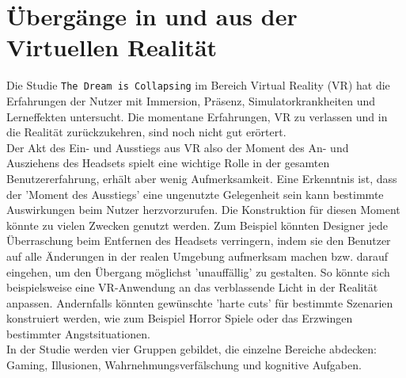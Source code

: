 \section{Übergänge in und aus der Virtuellen Realität}\label{sec:relatedWork.vr}

Die Studie \texttt{The Dream is Collapsing} im Bereich Virtual Reality (VR) hat die Erfahrungen der Nutzer mit Immersion, Präsenz, Simulatorkrankheiten und Lerneffekten untersucht. Die momentane Erfahrungen, VR zu verlassen und in die Realität zurückzukehren, sind noch nicht gut erörtert.\\
Der Akt des Ein- und Ausstiegs aus VR also der Moment des An- und Ausziehens des Headsets spielt eine wichtige Rolle in der gesamten Benutzererfahrung, erhält aber wenig Aufmerksamkeit. Eine Erkenntnis ist, dass der 'Moment des Ausstiegs' eine ungenutzte Gelegenheit sein kann bestimmte Auswirkungen beim Nutzer herzvorzurufen. Die Konstruktion für diesen Moment könnte zu vielen Zwecken genutzt werden. Zum Beispiel könnten Designer jede Überraschung beim Entfernen des Headsets verringern, indem sie den Benutzer auf alle Änderungen in der realen Umgebung aufmerksam machen bzw. darauf eingehen, um den Übergang möglichst 'unauffällig' zu gestalten. So könnte sich beispielsweise eine VR-Anwendung an das verblassende Licht in der Realität anpassen.
Andernfalls könnten gewünschte 'harte cuts' für bestimmte Szenarien konstruiert werden, wie zum Beispiel Horror Spiele oder das Erzwingen bestimmter Angstsituationen.\\
In der Studie werden vier Gruppen gebildet, die einzelne Bereiche abdecken: Gaming, Illusionen, Wahrnehmungsverfälschung und kognitive Aufgaben. \\

